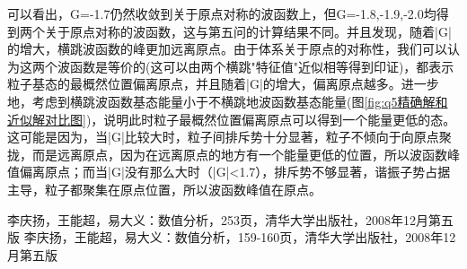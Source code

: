 \documentclass[10pt, a4paper]{article}
\begin{document}
    可以看出，G=-1.7仍然收敛到关于原点对称的波函数上，但G=-1.8,-1.9,-2.0均得到两个关于原点对称的波函数，这与第五问的计算结果不同。并且发现，随着|G|的增大，横跳波函数的峰更加远离原点。由于体系关于原点的对称性，我们可以认为这两个波函数是等价的(这可以由两个横跳"特征值"近似相等得到印证)，都表示粒子基态的最概然位置偏离原点，并且随着|G|的增大，偏离原点越多。进一步地，考虑到横跳波函数基态能量小于不横跳地波函数基态能量(图\ref{fig:q5精确解和近似解对比图})，说明此时粒子最概然位置偏离原点可以得到一个能量更低的态。这可能是因为，当|G|比较大时，粒子间排斥势十分显著，粒子不倾向于向原点聚拢，而是远离原点，因为在远离原点的地方有一个能量更低的位置，所以波函数峰值偏离原点；而当|G|没有那么大时（|G|<1.7），排斥势不够显著，谐振子势占据主导，粒子都聚集在原点位置，所以波函数峰值在原点。
    
    \begin{thebibliography}{99}  
      李庆扬，王能超，易大义：数值分析，253页，清华大学出版社，2008年12月第五版
      李庆扬，王能超，易大义：数值分析，159-160页，清华大学出版社，2008年12月第五版
    \end{thebibliography}
\end{document}
